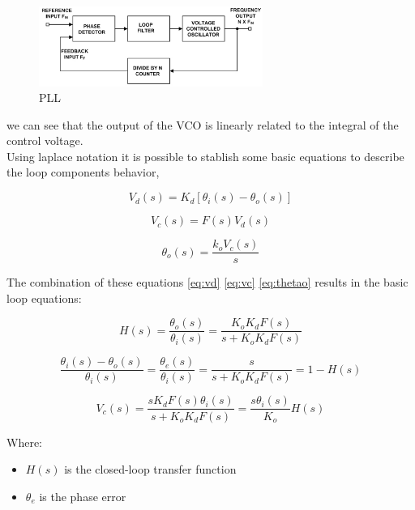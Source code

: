 \begin{figure}[htbp]
    \centering
    \includegraphics[width=0.65\textwidth]{./figures/pll.eps}
    \caption{ PLL
    \label{fig:pll2}}
\end{figure}

we can see that the output of the VCO is linearly related to the integral of the
control voltage.\\

Using laplace notation it is possible to stablish some basic equations to
describe the loop components behavior,

\begin{equation}
    V_d(s)=K_d[\theta_i(s) - \theta_o(s)]
    \label{eq:vd}
\end{equation}

\begin{equation}
    V_c(s)=F(s)V_d(s)
    \label{eq:vc}
\end{equation}

\begin{equation}
    \theta_o(s)=\frac{k_oV_c(s)}{s}
    \label{eq:thetao}
\end{equation}

The combination of these equations \ref{eq:vd} \ref{eq:vc} \ref{eq:thetao}
results in the basic loop equations:


\begin{equation}
    H(s)= \frac{\theta_o(s)}{\theta_i(s)}=
    \frac{K_oK_dF(s)}{s + K_oK_dF(s)}
    \label{eq:gentf}
\end{equation}

\begin{equation}
    \frac{\theta_i(s)-\theta_o(s)}{\theta_i(s)}=
    \frac{\theta_e(s)}{\theta_i(s)}=
    \frac{s}{s+K_oK_dF(s)}=1-H(s)
    \label{eq:pherr}
\end{equation}

\begin{equation}
    V_c(s)=\frac{sK_dF(s)\theta_i(s)}{s+K_oK_dF(s)}=
    \frac{s\theta_i(s)}{K_o}H(s) 
    \label{eq:vchs}
\end{equation}

Where:

\begin{itemize}
    \item $H(s)$ is the closed-loop transfer function
    \item $\theta_e$ is the phase error 
\end{itemize}

